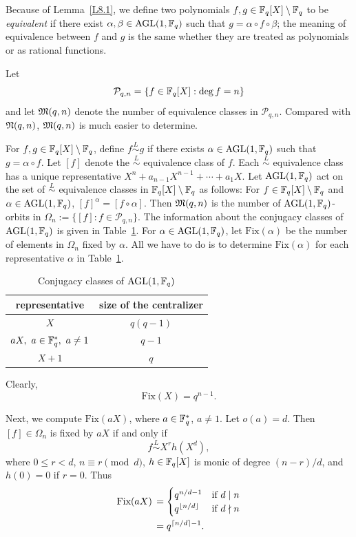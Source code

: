 \documentclass{amsart}
\numberwithin{equation}{section}
\theoremstyle{definition}
\newcommand{\f}{\Bbb F}
\begin{document}
Because of Lemma~\ref{L8.1}, we define
two polynomials $f,g\in\f_q[X]\setminus\f_q$ to be {\em equivalent} if there exist $\alpha,\beta\in\text{AGL}(1,\f_q)$ such that $g=\alpha\circ f\circ \beta$; the meaning of equivalence between $f$ and $g$ is the same whether they are treated as polynomials or as rational functions. 

Let
\[
\mathcal P_{q,n}=\{f\in\f_q[X]:\deg f=n\}
\]
and let $\frak M(q,n)$ denote the number of equivalence classes in $\mathcal P_{q,n}$. Compared with $\frak N(q,n)$, $\frak M(q,n)$ is much easier to determine.

For $f,g\in\f_q[X]\setminus\f_q$, define $f\overset L\sim g$ if there exists $\alpha\in\text{AGL}(1,\f_q)$ such that $g=\alpha\circ f$. Let $[f]$ denote the $\overset L\sim$ equivalence class of $f$. Each $\overset L\sim$ equivalence class has a unique representative $X^n+a_{n-1}X^{n-1}+\cdots+a_1X$. Let $\text{AGL}(1,\f_q)$ act on the set of $\overset L\sim$ equivalence classes in $\f_q[X]\setminus\f_q$ as follows: For $f\in\f_q[X]\setminus\f_q$ and $\alpha\in\text{AGL}(1,\f_q)$, $[f]^\alpha=[f\circ\alpha]$. Then $\frak M(q,n)$ is the number of $\text{AGL}(1,\f_q)$-orbits in $\Omega_n:=\{[f]:f\in\mathcal P_{q,n}\}$. The information about the conjugacy classes of $\text{AGL}(1,\f_q)$ is given in Table~\ref{Tb3}. For $\alpha\in\text{AGL}(1,\f_q)$, let 
$\text{Fix}(\alpha)$ be the number of elements in $\Omega_n$ fixed by $\alpha$. All we have to do is to determine $\text{Fix}(\alpha)$ for each representative $\alpha$ in Table~\ref{Tb3}.


\begin{table}[h]
\caption{Conjugacy classes of $\text{AGL}(1,\f_q)$}\label{Tb3}
   \renewcommand*{\arraystretch}{1.2}
    \centering
     \begin{tabular}{c|c}
     \hline
     	 representative & size of the centralizer \\ \hline      
         $X$ & $q(q-1)$  \\     
         $aX,\ a\in\f_q^*,\ a\ne 1$ & $q-1$  \\
         $X+1$ & $q$  \\
         \hline
    \end{tabular}
\end{table}

Clearly,
\begin{equation}\label{FixX}
\text{Fix}(X)=q^{n-1}.
\end{equation}

\medskip
Next, we compute $\text{Fix}(aX)$, where $a\in\f_q^*$, $a\ne 1$. Let $o(a)=d$. Then $[f]\in\Omega_n$ is fixed by $aX$ if and only if 
\[
f\overset L\sim X^rh(X^d),
\]
where $0\le r<d$, $n\equiv r\pmod d$, $h\in\f_q[X]$ is monic of degree $(n-r)/d$, and $h(0)=0$ if $r=0$. Thus
\begin{align}\label{FixaX}
\text{Fix}(aX)\,&=\begin{cases}
q^{n/d-1}&\text{if}\ d\mid n\cr
q^{\lfloor n/d\rfloor}&\text{if}\ d\nmid n
\end{cases}\\
&=q^{\lceil n/d\rceil-1}.\nonumber
\end{align}
\end{document}
